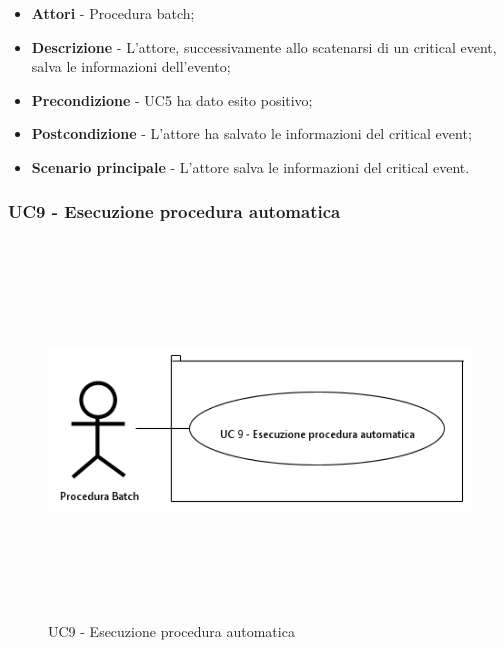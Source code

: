                 \begin{itemize}

                    \item \textbf{Attori} - Procedura batch;
                    \item \textbf{Descrizione} - L'attore, successivamente allo scatenarsi di un critical event, salva le informazioni
                    dell'evento;
                    \item \textbf{Precondizione} - UC5 ha dato esito positivo;
                    \item \textbf{Postcondizione} - L'attore ha salvato le informazioni del critical event;
                    \item \textbf{Scenario principale} - L'attore salva le informazioni del critical event.

                \end{itemize}

\newpage

            \subsubsection{UC9 - Esecuzione procedura automatica}

                \begin{figure}[H]
                    \centering
                    \includegraphics[width=13cm,height=10cm,keepaspectratio]{./images/UC9.png}
                    \caption{UC9 - Esecuzione procedura automatica}
                \end{figure}


